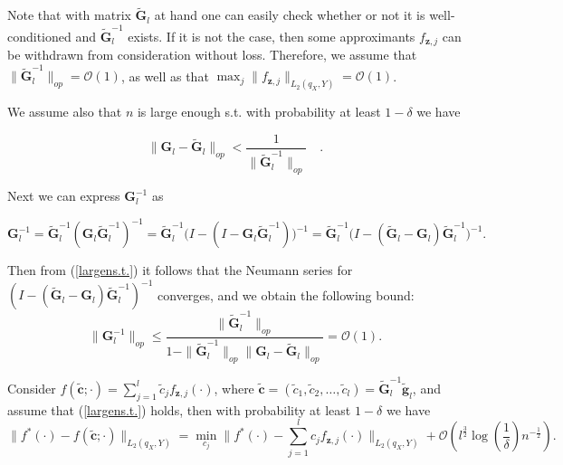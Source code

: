 \documentclass[twoside,11pt]{article}
\begin{document}
Note that with matrix $\widetilde{\mathbf{G}}_l$ at hand one can easily check whether or not it is well-conditioned and $\widetilde{\mathbf{G}}_l^{-1}$ exists. If it is not the case, then some approximants $f_{\mathbf{z},j}$ can be withdrawn from consideration without loss. Therefore, we assume that $\| \widetilde{\mathbf{G}}_l^{-1} \|_{op} = \mathcal{O}(1)$, as well as that $\max_j\|f_{\mathbf{z}, j}\|_{L_2(q_X,Y)} = \mathcal{O}(1)$.

We assume also that $n$ is large enough
s.t. with probability at least $1-\delta$ we have

\begin{equation}\label{largens.t.}
\big\|\mathbf{G}_l-\widetilde{\mathbf{G}}_l\big\|_{op} < \frac{1}{\|\widetilde{\mathbf{G}}_l^{-1}\|_{op}} \quad.
\end{equation}

\noindent
Next we can express $\mathbf{G}_l^{-1}$ as



\[
\mathbf{G}_l^{-1} = \widetilde{\mathbf{G}}_l^{-1}(\mathbf{G}_l\widetilde{\mathbf{G}}_l^{-1})^{-1} 
= \widetilde{\mathbf{G}}_l^{-1}\big(I - (I - \mathbf{G}_l\widetilde{\mathbf{G}}_l^{-1})\big)^{-1} 
= \widetilde{\mathbf{G}}_l^{-1}\big(I - (\widetilde{\mathbf{G}}_l-\mathbf{G}_l)\widetilde{\mathbf{G}}_l^{-1}\big)^{-1}.
\]

\noindent
Then from (\ref{largens.t.}) it follows that the Neumann series for \((I - (\widetilde{\mathbf{G}}_l-\mathbf{G}_l)\widetilde{\mathbf{G}}_l^{-1})^{-1}\) converges, and we obtain the following bound:
\[
\|\mathbf{G}_l^{-1}\|_{op} 
\leq \frac{\|\widetilde{\mathbf{G}}_l^{-1}\|_{op}}{1 - \|\widetilde{\mathbf{G}}_l^{-1}\|_{op} \|\mathbf{G}_l-\widetilde{\mathbf{G}}_l\|_{op}}
= \mathcal{O}(1).
\]

\begin{theorem}\label{Tagg}
Consider $f(\widetilde{\mathbf{c}};\cdot)  = \sum_{j=1}^l \tilde{c}_j f_{\mathbf{z}, j}(\cdot)$, 
where $\widetilde{\mathbf{c}}= (\tilde{c}_1, \tilde{c}_2, \ldots, \tilde{c}_l) = \widetilde{\mathbf{G}}_l^{-1}\tilde{\mathbf{g}}_l$, and assume that (\ref{largens.t.}) holds, then with probability at least $1-\delta$ we have
\[
\big\|f^*(\cdot) - f(\widetilde{\mathbf{c}};\cdot)\big\|_{L_2(q_X,Y)} = \min_{c_j} \Big\| f^*(\cdot) - \sum_{j=1}^l c_j f_{\mathbf{z},j}(\cdot)\Big\|_{L_2(q_X,Y)}
+ \mathcal{O}\left(l^{\frac{3}{2}} \log\left(\frac{1}{\delta}\right) n^{-\frac{1}{2}}\right).
\]
\end{theorem}

\medskip
\noindent
\end{document}
